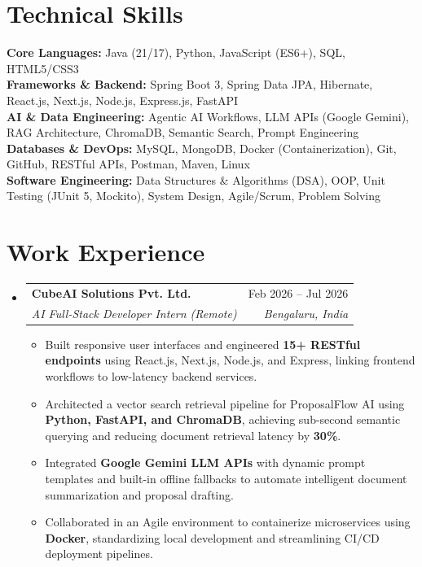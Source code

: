 \documentclass[letterpaper,10pt]{article}
\makeatletter
\newcommand{\resumeItem}[1]{
  \item\small{
    {#1 \vspace{-2pt}}
  }
}
\newcommand{\resumeSubheading}[4]{
  \vspace{-2pt}\item
    \begin{tabular*}{0.98\textwidth}[t]{l@{\extracolsep{\fill}}r}
      \textbf{#1} & #2 \\
      \textit{\small#3} & \textit{\small #4} \\
    \end{tabular*}\vspace{-4pt}
}
\newcommand{\resumeSubHeadingListStart}{\begin{itemize}[leftmargin=0.15in, label={}]}
\newcommand{\resumeSubHeadingListEnd}{\end{itemize}}
\newcommand{\resumeItemListStart}{\begin{itemize}[leftmargin=0.15in]}
\newcommand{\resumeItemListEnd}{\end{itemize}\vspace{-3pt}}
\makeatother
\begin{document}
\section{Technical Skills}
 \begin{itemize}[leftmargin=0.15in, label={}]
    \small{\item{
     \textbf{Core Languages:}{ Java (21/17), Python, JavaScript (ES6+), SQL, HTML5/CSS3} \\
     \textbf{Frameworks \& Backend:}{ Spring Boot 3, Spring Data JPA, Hibernate, React.js, Next.js, Node.js, Express.js, FastAPI} \\
     \textbf{AI \& Data Engineering:}{ Agentic AI Workflows, LLM APIs (Google Gemini), RAG Architecture, ChromaDB, Semantic Search, Prompt Engineering} \\
     \textbf{Databases \& DevOps:}{ MySQL, MongoDB, Docker (Containerization), Git, GitHub, RESTful APIs, Postman, Maven, Linux} \\
     \textbf{Software Engineering:}{ Data Structures \& Algorithms (DSA), OOP, Unit Testing (JUnit 5, Mockito), System Design, Agile/Scrum, Problem Solving}
    }}
 \end{itemize}

\section{Work Experience}
  \resumeSubHeadingListStart
    \resumeSubheading
      {CubeAI Solutions Pvt. Ltd.}{Feb 2026 -- Jul 2026}
      {AI Full-Stack Developer Intern (Remote)}{Bengaluru, India}
      \resumeItemListStart
        \resumeItem{Built responsive user interfaces and engineered \textbf{15+ RESTful endpoints} using React.js, Next.js, Node.js, and Express, linking frontend workflows to low-latency backend services.}
        \resumeItem{Architected a vector search retrieval pipeline for ProposalFlow AI using \textbf{Python, FastAPI, and ChromaDB}, achieving sub-second semantic querying and reducing document retrieval latency by \textbf{30\%}.}
        \resumeItem{Integrated \textbf{Google Gemini LLM APIs} with dynamic prompt templates and built-in offline fallbacks to automate intelligent document summarization and proposal drafting.}
        \resumeItem{Collaborated in an Agile environment to containerize microservices using \textbf{Docker}, standardizing local development and streamlining CI/CD deployment pipelines.}
      \resumeItemListEnd
  \resumeSubHeadingListEnd
\end{document}
